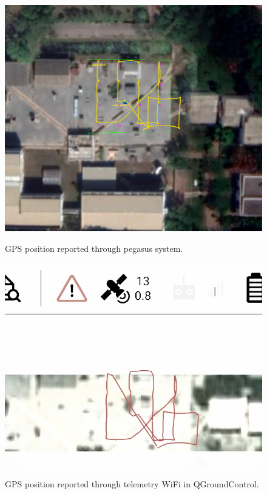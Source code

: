 \begin{figure}
	\centering
	\caption[GPS position reported through pegasus system.]{\small GPS position reported through pegasus system.} 
	\includegraphics[width=5in]{figures/experiment/real_mapviz_path}
	\label{fig:real-gps}
\end{figure}

\begin{figure}
	\centering
	\caption[GPS position reported through telemetry wifi.]{\small GPS position reported through telemetry WiFi in QGroundControl.} 
	\includegraphics[width=5in]{figures/experiment/q-ground-control}
	\label{fig:q-real-gps}
\end{figure}


